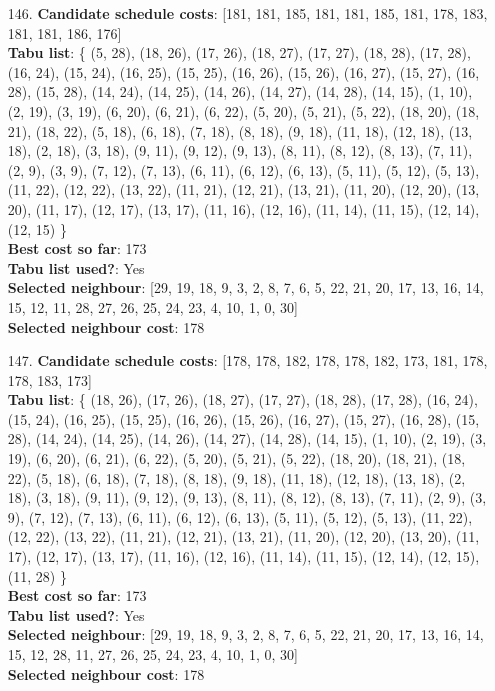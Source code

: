 \documentclass[fleqn]{article}
\begin{document}
\begin{itemize}
    \item[146.] \textbf{Candidate schedule costs}: [181, 181, 185, 181, 181, 185, 181, 178, 183, 181, 181, 186, 176] \\
    \textbf{Tabu list}: \{ (5, 28), (18, 26), (17, 26), (18, 27), (17, 27), (18, 28), (17, 28), (16, 24), (15, 24), (16, 25), (15, 25), (16, 26), (15, 26), (16, 27), (15, 27), (16, 28), (15, 28), (14, 24), (14, 25), (14, 26), (14, 27), (14, 28), (14, 15), (1, 10), (2, 19), (3, 19), (6, 20), (6, 21), (6, 22), (5, 20), (5, 21), (5, 22), (18, 20), (18, 21), (18, 22), (5, 18), (6, 18), (7, 18), (8, 18), (9, 18), (11, 18), (12, 18), (13, 18), (2, 18), (3, 18), (9, 11), (9, 12), (9, 13), (8, 11), (8, 12), (8, 13), (7, 11), (2, 9), (3, 9), (7, 12), (7, 13), (6, 11), (6, 12), (6, 13), (5, 11), (5, 12), (5, 13), (11, 22), (12, 22), (13, 22), (11, 21), (12, 21), (13, 21), (11, 20), (12, 20), (13, 20), (11, 17), (12, 17), (13, 17), (11, 16), (12, 16), (11, 14), (11, 15), (12, 14), (12, 15) \} \\
    \textbf{Best cost so far}: 173 \\
    \textbf{Tabu list used?}: Yes \\
    \textbf{Selected neighbour}: [29, 19, 18, 9, 3, 2, 8, 7, 6, 5, 22, 21, 20, 17, 13, 16, 14, 15, 12, 11, 28, 27, 26, 25, 24, 23, 4, 10, 1, 0, 30] \\
    \textbf{Selected neighbour cost}: 178
      

    \item[147.] \textbf{Candidate schedule costs}: [178, 178, 182, 178, 178, 182, 173, 181, 178, 178, 183, 173] \\
    \textbf{Tabu list}: \{ (18, 26), (17, 26), (18, 27), (17, 27), (18, 28), (17, 28), (16, 24), (15, 24), (16, 25), (15, 25), (16, 26), (15, 26), (16, 27), (15, 27), (16, 28), (15, 28), (14, 24), (14, 25), (14, 26), (14, 27), (14, 28), (14, 15), (1, 10), (2, 19), (3, 19), (6, 20), (6, 21), (6, 22), (5, 20), (5, 21), (5, 22), (18, 20), (18, 21), (18, 22), (5, 18), (6, 18), (7, 18), (8, 18), (9, 18), (11, 18), (12, 18), (13, 18), (2, 18), (3, 18), (9, 11), (9, 12), (9, 13), (8, 11), (8, 12), (8, 13), (7, 11), (2, 9), (3, 9), (7, 12), (7, 13), (6, 11), (6, 12), (6, 13), (5, 11), (5, 12), (5, 13), (11, 22), (12, 22), (13, 22), (11, 21), (12, 21), (13, 21), (11, 20), (12, 20), (13, 20), (11, 17), (12, 17), (13, 17), (11, 16), (12, 16), (11, 14), (11, 15), (12, 14), (12, 15), (11, 28) \} \\
    \textbf{Best cost so far}: 173 \\
    \textbf{Tabu list used?}: Yes \\
    \textbf{Selected neighbour}: [29, 19, 18, 9, 3, 2, 8, 7, 6, 5, 22, 21, 20, 17, 13, 16, 14, 15, 12, 28, 11, 27, 26, 25, 24, 23, 4, 10, 1, 0, 30] \\
    \textbf{Selected neighbour cost}: 178
      


\end{itemize}
\end{document}
